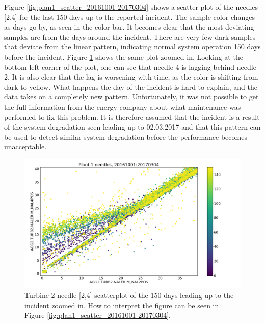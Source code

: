         Figure \ref{fig:plan1_scatter_20161001-20170304} shows a scatter plot of the needles [2,4] for the last 150 days up to the reported incident. The sample color changes as days go by, as seen in the color bar. It becomes clear that the most deviating samples are from the days around the incident. There are very few dark samples that deviate from the linear pattern, indicating normal system operation 150 days before the incident. Figure \ref{fig:plan1_scatter_20161001-20170304_40} shows the same plot zoomed in. Looking at the bottom left corner of the plot, one can see that needle 4 is lagging behind needle 2. It is also clear that the lag is worsening with time, as the color is shifting from dark to yellow. What happens the day of the incident is hard to explain, and the data takes on a completely new pattern. Unfortunately, it was not possible to get the full information from the energy company about what maintenance was performed to fix this problem. It is therefore assumed that the incident is a result of the system degradation seen leading up to 02.03.2017 and that this pattern can be used to detect similar system degradation before the performance becomes unacceptable.     
        \begin{figure}
            \centering
            \includegraphics[width=\textwidth]{report/figures/analysis/plant1_error/needle_2_4_20161001-20170304_40_dots.png}
            \caption{Turbine 2 needle [2,4] scatterplot of the 150 days leading up to the incident zoomed in. How to interpret the figure can be seen in Figure \ref{fig:plan1_scatter_20161001-20170304}.}
            \label{fig:plan1_scatter_20161001-20170304_40}
        \end{figure}
        
